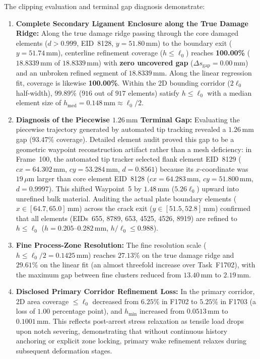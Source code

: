 The clipping evaluation and terminal gap diagnosis demonstrate:
\begin{enumerate}
  \item \textbf{Complete Secondary Ligament Enclosure along the True Damage Ridge:} Along the true damage ridge passing through the core damaged elements ($d > 0.999$, EID~8128, $y = 51.80\,\mathrm{mm}$) to the boundary exit ($y = 51.74\,\mathrm{mm}$), centerline refinement coverage ($h \le \ell_0$) reaches \textbf{100.00\%} ($18.8339\,\mathrm{mm}$ of $18.8339\,\mathrm{mm}$) with \textbf{zero uncovered gap} ($\Delta s_{\mathrm{gap}} = 0.00\,\mathrm{mm}$) and an unbroken refined segment of $18.8339\,\mathrm{mm}$. Along the linear regression fit, coverage is likewise \textbf{100.00\%}. Within the 2D bounding corridor ($2\ell_0$ half-width), $99.89\%$ ($916$ out of $917$ elements) satisfy $h \le \ell_0$ with a median element size of $h_{\mathrm{med}} = 0.148\,\mathrm{mm} \approx \ell_0/2$.
  \item \textbf{Diagnosis of the Piecewise $1.26\,\mathrm{mm}$ Terminal Gap:} Evaluating the piecewise trajectory generated by automated tip tracking revealed a $1.26\,\mathrm{mm}$ gap ($93.47\%$ coverage). Detailed element audit proved this gap to be a geometric waypoint reconstruction artifact rather than a mesh deficiency: in Frame~100, the automated tip tracker selected flank element EID~8129 ($cx = 64.302\,\mathrm{mm}$, $cy = 53.284\,\mathrm{mm}$, $d = 0.8561$) because its $x$-coordinate was $19\,\mu\mathrm{m}$ larger than core element EID~8128 ($cx = 64.283\,\mathrm{mm}$, $cy = 51.800\,\mathrm{mm}$, $d = 0.9997$). This shifted Waypoint~5 by $1.48\,\mathrm{mm}$ ($5.26\ell_0$) upward into unrefined bulk material. Auditing the actual plate boundary elements ($x \in [64.7, 65.0]\,\mathrm{mm}$) across the crack exit ($y \in [51.5, 52.8]\,\mathrm{mm}$) confirmed that all elements (EIDs~655, 8789, 653, 4525, 4526, 8919) are refined to $h \le \ell_0$ ($h = 0.205$--$0.282\,\mathrm{mm}$, $h/\ell_0 \le 0.988$).
  \item \textbf{Fine Process-Zone Resolution:} The fine resolution scale ($h \le \ell_0/2 = 0.1425\,\mathrm{mm}$) reaches $27.13\%$ on the true damage ridge and $29.61\%$ on the linear fit (an almost threefold increase over Task~F1702), with the maximum gap between fine clusters reduced from $13.40\,\mathrm{mm}$ to $2.19\,\mathrm{mm}$.
  \item \textbf{Disclosed Primary Corridor Refinement Loss:} In the primary corridor, 2D area coverage $\le \ell_0$ decreased from $6.25\%$ in F1702 to $5.25\%$ in F1703 (a loss of $1.00$ percentage point), and $h_{\min}$ increased from $0.0513\,\mathrm{mm}$ to $0.1001\,\mathrm{mm}$. This reflects post-arrest stress relaxation as tensile load drops upon notch severing, demonstrating that without continuous history anchoring or explicit zone locking, primary wake refinement relaxes during subsequent deformation stages.

\end{enumerate}
